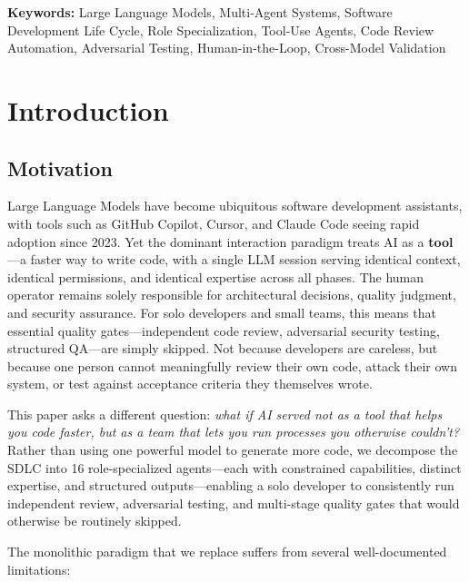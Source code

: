 \documentclass[11pt,a4paper]{article}
\begin{document}
\noindent\textbf{Keywords:} Large Language Models, Multi-Agent Systems, Software Development Life Cycle, Role Specialization, Tool-Use Agents, Code Review Automation, Adversarial Testing, Human-in-the-Loop, Cross-Model Validation

\section{Introduction}

\subsection{Motivation}

Large Language Models have become ubiquitous software development assistants, with tools such as GitHub Copilot, Cursor, and Claude Code seeing rapid adoption since 2023. Yet the dominant interaction paradigm treats AI as a \textbf{tool}---a faster way to write code, with a single LLM session serving identical context, identical permissions, and identical expertise across all phases. The human operator remains solely responsible for architectural decisions, quality judgment, and security assurance. For solo developers and small teams, this means that essential quality gates---independent code review, adversarial security testing, structured QA---are simply skipped. Not because developers are careless, but because one person cannot meaningfully review their own code, attack their own system, or test against acceptance criteria they themselves wrote.

This paper asks a different question: \textit{what if AI served not as a tool that helps you code faster, but as a team that lets you run processes you otherwise couldn't?} Rather than using one powerful model to generate more code, we decompose the SDLC into 16 role-specialized agents---each with constrained capabilities, distinct expertise, and structured outputs---enabling a solo developer to consistently run independent review, adversarial testing, and multi-stage quality gates that would otherwise be routinely skipped.

The monolithic paradigm that we replace suffers from several well-documented limitations:
\end{document}
